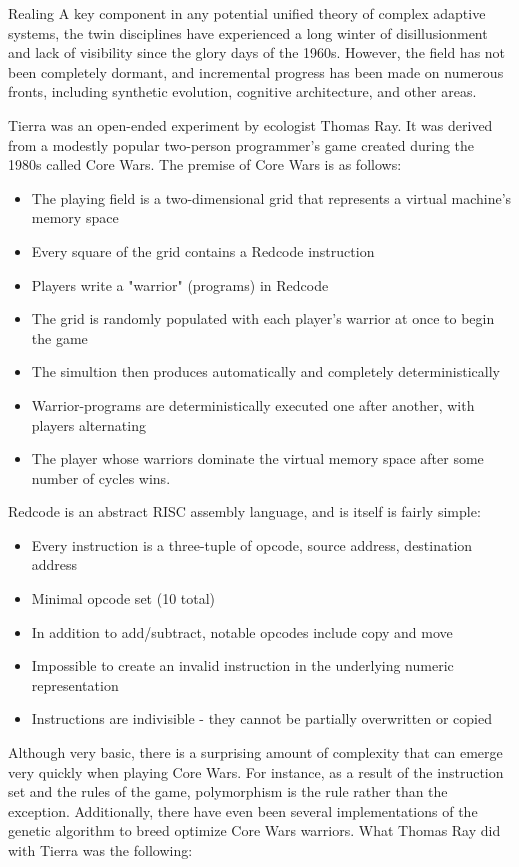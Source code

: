 \documentclass{article}
\begin{document}
Realing A key component in any potential unified theory of complex adaptive systems, the twin disciplines have experienced a long winter of disillusionment and lack of visibility since the glory days of the 1960s. However, the field has not been completely dormant, and incremental progress has been made on numerous fronts, including synthetic evolution, cognitive architecture, and other areas.

Tierra was an open-ended experiment by ecologist Thomas Ray. It was derived from a modestly popular two-person programmer's game created during the 1980s called Core Wars. The premise of Core Wars is as follows:

\begin{itemize}
\item The playing field is a two-dimensional grid that represents a virtual machine's memory space
\item Every square of the grid contains a Redcode instruction
\item Players write a "warrior" (programs) in Redcode
\item The grid is randomly populated with each player's warrior at once to begin the game
\item The simultion then produces automatically and completely deterministically
\item Warrior-programs are deterministically executed one after another, with players alternating 
\item The player whose warriors dominate the virtual memory space after some number of cycles wins.
\end{itemize}

Redcode is an abstract RISC assembly language, and is itself is fairly simple:

\begin{itemize}
\item Every instruction is a three-tuple of opcode, source address, destination address
\item Minimal opcode set (10 total)
\item In addition to add/subtract, notable opcodes include copy and move
\item Impossible to create an invalid instruction in the underlying numeric representation
\item Instructions are indivisible - they cannot be partially overwritten or copied
\end{itemize}

	Although very basic, there is a surprising amount of complexity that can emerge very quickly when playing Core Wars. For instance, as a result of the instruction set and the rules of the game, polymorphism is the rule rather than the exception. Additionally, there have even been several implementations of the genetic algorithm to breed optimize Core Wars warriors. What Thomas Ray did with Tierra was the following: 
\end{document}
